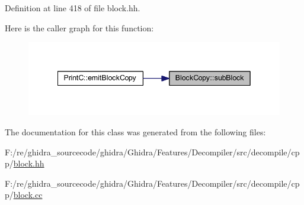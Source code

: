 Definition at line 418 of file block.\+hh.

Here is the caller graph for this function\+:
\nopagebreak
\begin{figure}[H]
\begin{center}
\leavevmode
\includegraphics[width=342pt]{class_block_copy_ae8eff265a0d9da347eda0042796c058b_icgraph}
\end{center}
\end{figure}


The documentation for this class was generated from the following files\+:\begin{DoxyCompactItemize}
\item 
F\+:/re/ghidra\+\_\+sourcecode/ghidra/\+Ghidra/\+Features/\+Decompiler/src/decompile/cpp/\mbox{\hyperlink{block_8hh}{block.\+hh}}\item 
F\+:/re/ghidra\+\_\+sourcecode/ghidra/\+Ghidra/\+Features/\+Decompiler/src/decompile/cpp/\mbox{\hyperlink{block_8cc}{block.\+cc}}\end{DoxyCompactItemize}
